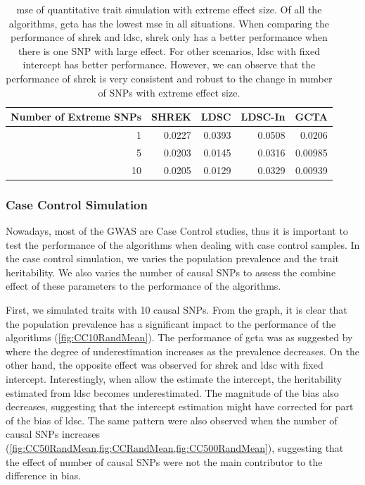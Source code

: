 		\begin{table}
			\centering
			\begin{tabular}{rrrrr}
				\toprule
				Number of Extreme SNPs&	SHREK&	LDSC&	LDSC-In&	GCTA \\
				\midrule
				1	&	0.0227	&	0.0393	&	0.0508	&	0.0206\\
				5	&	0.0203	&	0.0145	&	0.0316	&	0.00985\\
				10	&	0.0205	&	0.0129	&	0.0329	&	0.00939\\
				\bottomrule
			\end{tabular}
			\caption[MSE of Quantitative Trait Simulation with Extreme Effect Size]{
				\gls{mse} of quantitative trait simulation with extreme effect size.
				Of all the algorithms, \gls{gcta} has the lowest \gls{mse} in all situations.
				When comparing the performance of \gls{shrek} and \gls{ldsc}, \gls{shrek} only has a better performance when there is one \gls{SNP} with large effect. 
				For other scenarios, \gls{ldsc} with fixed intercept has better performance.
				However, we can observe that the performance of \gls{shrek} is very consistent and robust to the change in number of \glspl{SNP} with extreme effect size.
				}
			\label{tab:mseEx100c}
		\end{table}
		
		\subsubsection{Case Control Simulation}
		
		Nowadays, most of the \gls{GWAS} are Case Control studies, thus it is important to test the performance of the algorithms when dealing with case control samples. 
		In the case control simulation, we varies the population prevalence and the trait heritability. 
		We also varies the number of causal \glspl{SNP} to assess the combine effect of these parameters to the performance of the algorithms.
		
		First, we simulated traits with 10 causal \glspl{SNP}.
		From the graph, it is clear that the population prevalence has a significant impact to the performance of the algorithms (\cref{fig:CC10RandMean}). 
		The performance of \gls{gcta} was as suggested by \citet{Golan2014} where the degree of underestimation increases as the prevalence decreases.
		On the other hand, the opposite effect was observed for \gls{shrek} and \gls{ldsc} with fixed intercept.
		Interestingly, when allow the estimate the intercept, the heritability estimated from \gls{ldsc} becomes underestimated. 
		The magnitude of the bias also decreases, suggesting that the intercept estimation might have corrected for part of the bias of \gls{ldsc}.
		The same pattern were also observed when the number of causal \glspl{SNP} increases (\cref{fig:CC50RandMean,fig:CCRandMean,fig:CC500RandMean}), suggesting that the effect of number of causal \glspl{SNP} were not the main contributor to the difference in bias. 
		
